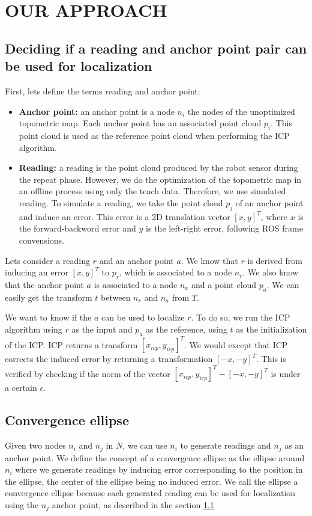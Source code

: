 \documentclass[letterpaper,10 pt,conference]{ieeeconf}
\begin{document}
\section{OUR APPROACH}
\label{approach}

\subsection{Deciding if a reading and anchor point pair can be used for localization}
\label{approach-deciding-converge}

First, lets define the terms reading and anchor point:

\begin{itemize}
  \item \textbf{Anchor point:} an anchor point is a node $n_i$ the nodes of the unoptimized topometric map. Each
    anchor point has an associated point cloud $p_i$. This point cloud is used as the reference point cloud when performing the
    ICP algorithm.
  \item \textbf{Reading:} a reading is the point cloud produced by the robot sensor during the repeat phase. However,
    we do the optimization of the topometric map in an offline process using only the teach data. Therefore,
    we use simulated reading. To simulate a reading, we take the point cloud $p_j$ of an anchor point and induce an
    error. This error is a 2D translation vector $[x, y]^T$, where $x$ is the forward-backword error and $y$ is the left-right error,
    following ROS frame convensions.
\end{itemize}

Lets consider a reading $r$ and an anchor point $a$. We know that $r$ is derived from inducing an error $[x, y]^T$ to $p_r$, which is associated to a node $n_r$.
We also know that the anchor point $a$ is associated to a node $n_a$ and a point cloud $p_a$. We can easily get the transform $t$ between $n_r$ and $n_a$ from $T$.


We want to know if the $a$ can be used to localize $r$. To do so, we run the ICP algorithm using $r$ as the input and $p_a$ as the reference, using $t$
as the initialization of the ICP. ICP returns a transform $[x_{icp}, y_{icp}]^T$. We would except that ICP corrects the induced error by returning
a transformation $[-x, -y]^T$. This is verified by checking if the norm of the vector $[x_{icp}, y_{icp}]^T - [-x, -y]^T$ is under a certain $\epsilon$.


\subsection{Convergence ellipse}
Given two nodes $n_i$ and $n_j$ in $N$, we can use $n_i$ to generate readings and $n_j$ as an anchor point.
We define the concept of a convergence ellipse as the ellipse around $n_i$ where we generate readings by inducing
error corresponding to the position in the ellipse, the center of the ellipse being no induced error. We call the ellipse
a convergence ellipse because each generated reading can be used for localization using the $n_j$ anchor point, as described in the
section \ref{approach-deciding-converge}
\end{document}
